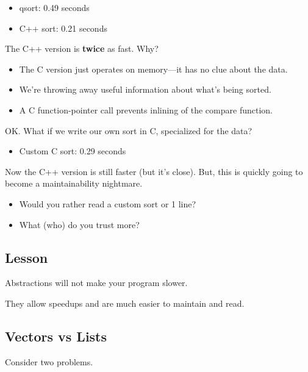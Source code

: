 \documentclass[a4paper]{report}
\begin{document}
\begin{itemize}
\item qsort: 0.49 seconds
\item C++ sort: 0.21 seconds
\end{itemize}

The C++ version is {\bf twice} as fast. Why?
      \begin{itemize}
        \item The C version just operates on memory---it has no clue about the
          data.
        \item We're throwing away useful information about what's being sorted.
        \item A C function-pointer call prevents inlining of the compare function.
      \end{itemize}
OK. What if we write our own sort in C, specialized for the data?

\begin{itemize}
\item Custom C sort: 0.29 seconds
\end{itemize}

Now the C++ version is still faster (but it's close). But, this is
quickly going to become a maintainability nightmare.
      \begin{itemize}
        \item Would you rather read a custom sort or 1 line?
        \item What (who) do you trust more?
      \end{itemize}

\subsection*{Lesson}
Abstractions will not make your program slower. 

\noindent
They allow speedups and are much easier to maintain and read.

\subsection*{Vectors vs Lists}
Consider two
problems.
\end{document}
